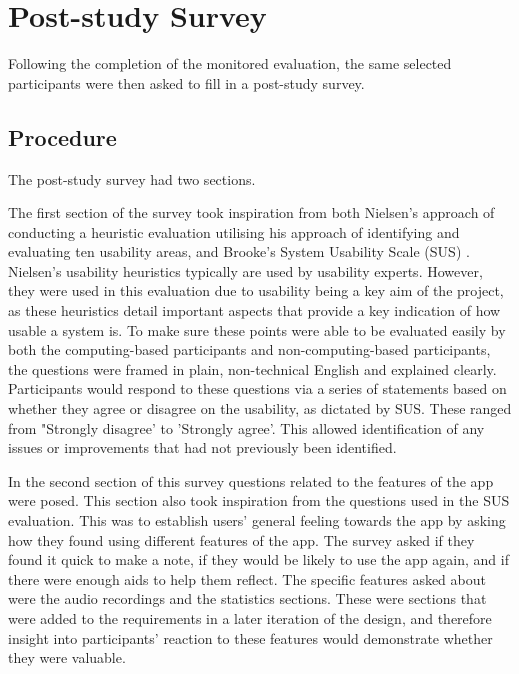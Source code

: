 \documentclass{l4proj}
\begin{document}
\section{Post-study Survey}

Following the completion of the monitored evaluation, the same selected participants were then asked to fill in a post-study survey. 

\subsection{Procedure}

The post-study survey had two sections.

The first section of the survey took inspiration from both Nielsen’s approach of conducting a heuristic evaluation utilising his approach of identifying and evaluating ten usability areas, and Brooke's System Usability Scale (SUS) \citep{Nielsen10, affairs_system_2013}. Nielsen's usability heuristics typically are used by usability experts. However, they were used in this evaluation due to usability being a key aim of the project, as these heuristics detail important aspects that provide a key indication of how usable a system is. To make sure these points were able to be evaluated easily by both the computing-based participants and non-computing-based participants, the questions were framed in plain, non-technical English and explained clearly. Participants would respond to these questions via a series of statements based on whether they agree or disagree on the usability, as dictated by SUS. These ranged from "Strongly disagree' to 'Strongly agree'. This allowed identification of any issues or improvements that had not previously been identified. 

In the second section of this survey questions related to the features of the app were posed. This section also took inspiration from the questions used in the SUS evaluation. This was to establish users' general feeling towards the app by asking how they found using different features of the app. The survey asked if they found it quick to make a note, if they would be likely to use the app again, and if there were enough aids to help them reflect. The specific features asked about were the audio recordings and the statistics sections. These were sections that were added to the requirements in a later iteration of the design, and therefore insight into participants' reaction to these features would demonstrate whether they were valuable. 
\end{document}
